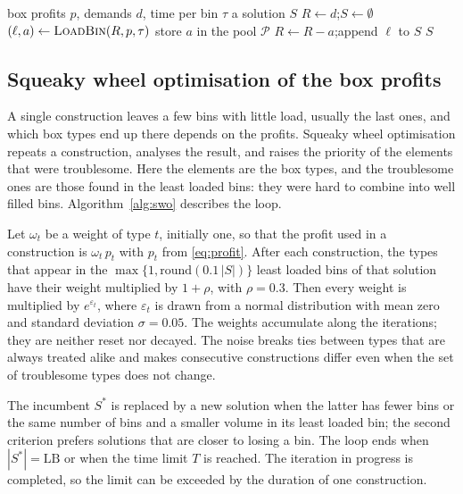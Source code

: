 \begin{algorithm}[t]
\caption{$\textsc{Construct}(p)$}
\label{alg:construct}
\begin{algorithmic}[1]
\Require box profits $p$, demands $d$, time per bin $\tau$
\Ensure a solution $S$
\State $R\gets d$;\quad $S\gets\emptyset$
  \State $(\ell,a)\gets \textsc{LoadBin}(R,p,\tau)$ 
  \State store $a$ in the pool $\mathcal{P}$ 
  \State $R\gets R-a$;\quad append $\ell$ to $S$
\EndWhile
\State \Return $S$
\end{algorithmic}
\end{algorithm}

\subsection{Squeaky wheel optimisation of the box profits}
\label{sec:m-swo}

A single construction leaves a few bins with little load, usually the last ones, and which box
types end up there depends on the profits. Squeaky wheel optimisation \citep{Joslin1999} repeats
a construction, analyses the result, and raises the priority of the elements that were
troublesome. Here the elements are the box types, and the troublesome ones are those found in
the least loaded bins: they were hard to combine into well filled bins. Algorithm~\ref{alg:swo}
describes the loop.

Let $\omega_t$ be a weight of type $t$, initially one, so that the profit used in a construction is
$\omega_t\,p_t$ with $p_t$ from \eqref{eq:profit}. After each construction, the types that appear in
the $\max\{1,\mathrm{round}(0.1\,|S|)\}$ least loaded bins of that solution have their weight multiplied by
$1+\rho$, with $\rho=0.3$. Then every weight is multiplied by $e^{\varepsilon_t}$, where
$\varepsilon_t$ is drawn from a normal distribution with mean zero and standard deviation
$\sigma=0.05$. The weights accumulate along the iterations; they are neither reset nor decayed.
The noise breaks ties between types that are always treated alike and makes consecutive
constructions differ even when the set of troublesome types does not change.

The incumbent $S^*$ is replaced by a new solution when the latter has fewer bins or the same
number of bins and a smaller volume in its least loaded bin; the second criterion prefers
solutions that are closer to losing a bin. The loop ends when $|S^*|=\mathrm{LB}$ or when the
time limit $T$ is reached. The iteration in progress is completed, so the limit can be exceeded
by the duration of one construction.

